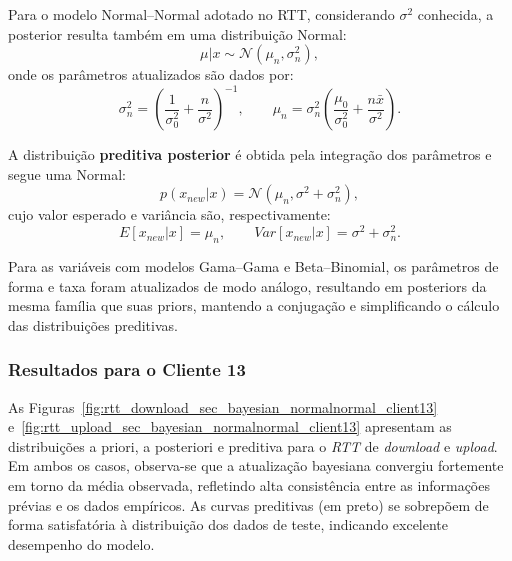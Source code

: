 \documentclass{article}
\begin{document}
Para o modelo Normal–Normal adotado no RTT, considerando $\sigma^2$ conhecida, a posterior
resulta também em uma distribuição Normal:
\begin{equation}
	\mu | x \sim \mathcal{N}(\mu_n, \sigma_n^2),
\end{equation}
onde os parâmetros atualizados são dados por:
\begin{equation}
	\sigma_n^2 = \left( \frac{1}{\sigma_0^2} + \frac{n}{\sigma^2} \right)^{-1},
	\qquad
	\mu_n = \sigma_n^2 \left( \frac{\mu_0}{\sigma_0^2} + \frac{n \bar{x}}{\sigma^2} \right).
\end{equation}

A distribuição \textbf{preditiva posterior} é obtida pela integração dos parâmetros e segue
uma Normal:
\begin{equation}
	p(x_{new}|x) = \mathcal{N}(\mu_n, \sigma^2 + \sigma_n^2),
\end{equation}
cujo valor esperado e variância são, respectivamente:
\[
E[x_{new}|x] = \mu_n, \qquad
Var[x_{new}|x] = \sigma^2 + \sigma_n^2.
\]

Para as variáveis com modelos Gama–Gama e Beta–Binomial, os parâmetros de forma e taxa
foram atualizados de modo análogo, resultando em posteriors da mesma família que suas priors,
mantendo a conjugação e simplificando o cálculo das distribuições preditivas.

\subsubsection{Resultados para o Cliente 13}

As Figuras~\ref{fig:rtt_download_sec_bayesian_normalnormal_client13}
e~\ref{fig:rtt_upload_sec_bayesian_normalnormal_client13} apresentam as distribuições
a priori, a posteriori e preditiva para o \textit{RTT} de \textit{download} e \textit{upload}.
Em ambos os casos, observa-se que a atualização bayesiana convergiu fortemente em torno da média
observada, refletindo alta consistência entre as informações prévias e os dados empíricos.
As curvas preditivas (em preto) se sobrepõem de forma satisfatória à distribuição dos dados de teste,
indicando excelente desempenho do modelo.
\end{document}
